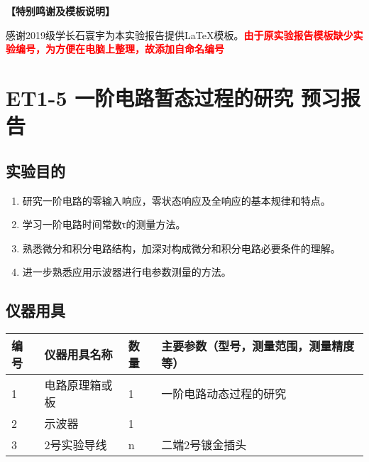 \documentclass[dvipsnames, svgnames,a4paper,11pt]{article}
\begin{document}
	\textbf{【特别鸣谢及模板说明】}	
	
	感谢2019级学长石寰宇为本实验报告提供\LaTeX 模板。\textcolor{red}{\textbf{由于原实验报告模板缺少实验编号，为方便在电脑上整理，故添加自命名编号}}
	
	
	
	\clearpage
	\tableofcontents
	\clearpage
	
	
	
	
	\setcounter{section}{0}
	\section{ET1-5 一阶电路暂态过程的研究 \quad\heiti 预习报告}
	
	\subsection{实验目的}
	\begin{enumerate}
		\item 研究一阶电路的零输入响应，零状态响应及全响应的基本规律和特点。
		\item 学习一阶电路时间常数τ的测量方法。
		\item 熟悉微分和积分电路结构，加深对构成微分和积分电路必要条件的理解。
		\item 进一步熟悉应用示波器进行电参数测量的方法。
		
	\end{enumerate}
	
	\subsection{仪器用具}
	\begin{table}[htbp]
		\centering
		\renewcommand\arraystretch{1.6}
		\begin{tabular}{p{}|p{}|p{}|p{}}
			\hline
			编号& 仪器用具名称 & 数量 &  主要参数（型号，测量范围，测量精度等） \\
			\hline
			1& 电路原理箱或板 & 1 & 一阶电路动态过程的研究 \\
			\hline
			2& 示波器 & 1 &  \\
			\hline
			3& 2号实验导线 & n & 二端2号镀金插头  \\
			\hline

		\end{tabular}
	\end{table}
	
\end{document}
